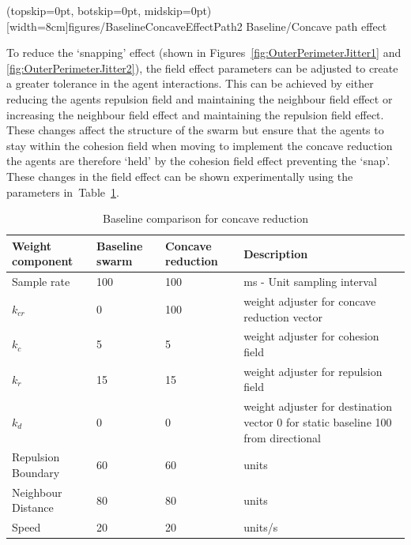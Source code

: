 \documentclass{ieeeaccess}
\begin{document}
\Figure[t!](topskip=0pt, botskip=0pt, midskip=0pt)[width=8cm]{figures/BaselineConcaveEffectPath2}
{Baseline/Concave path effect\label{concave:BaselineConcaveEffectPath2}}


To reduce the `snapping' effect (shown in Figures~\ref{fig:OuterPerimeterJitter1} and \ref{fig:OuterPerimeterJitter2}), the field effect parameters can be adjusted to create a greater tolerance in the agent interactions. This can be achieved by either reducing the agents repulsion field and maintaining the neighbour field effect or increasing the neighbour field effect and maintaining the repulsion field effect. These changes affect the structure of the swarm but ensure that the agents to stay within the cohesion field when moving to implement the concave reduction the agents are therefore `held' by the cohesion field effect preventing the `snap'. These changes in the field effect can be shown experimentally using the parameters in~Table~\ref{tab:BaselineConcaveReduction2}. 

\begin{table}
\caption{Baseline comparison for concave reduction} 
\label{tab:BaselineConcaveReduction2}
\begin{center}
\begin{tabular}{| p{1.4cm} | p{1.2cm} | p{1.2cm} | p{2.5cm} |}
\hline
\bf Weight \bf component & \bf Baseline \bf swarm & \bf Concave \bf reduction & \bf Description \\ \hline
Sample rate & 100 & 100 & ms - Unit sampling interval\\  \hline
$k_{cr}$ & 0 & 100 & weight adjuster for concave reduction vector\\  \hline
$k_c$ & 5 & 5 & weight adjuster for cohesion field\\  \hline
$k_r$ & 15 & 15 & weight adjuster for repulsion field\\  \hline
$k_d$ & 0 & 0 & weight adjuster for destination vector 0 for static baseline 100 from directional\\  \hline
Repulsion Boundary & 60 & 60 & units\\  \hline
Neighbour Distance & 80 & 80 & units\\  \hline
Speed & 20 & 20 & units/s\\  \hline
\end{tabular}
\end{center}
\end{table}
\end{document}
